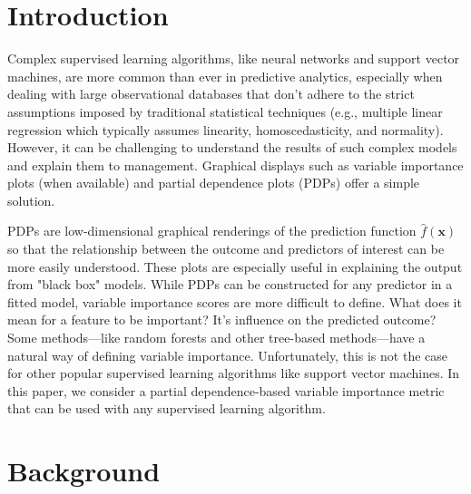 \documentclass[12pt]{article}
\begin{document}
\newpage
{} %


\section{Introduction}
\label{sec:introduction}

Complex supervised learning algorithms, like neural networks and support vector machines, are more common than ever in predictive analytics, especially when dealing with large observational databases that don't adhere to the strict assumptions imposed by traditional statistical techniques (e.g., multiple linear regression which typically assumes linearity, homoscedasticity, and normality). However, it can be challenging to understand the results of such complex models and explain them to management. Graphical displays such as variable importance plots (when available) and partial dependence plots (PDPs) offer a simple solution. 

PDPs are low-dimensional graphical renderings of the prediction function $\widehat{f}\left(\boldsymbol{x}\right)$ so that the relationship between the outcome and predictors of interest can be more easily understood. These plots are especially useful in explaining the output from "black box" models. While PDPs can be constructed for any predictor in a fitted model, variable importance scores are more difficult to define. What does it mean for a feature to be important? It's influence on the predicted outcome? Some methods---like random forests and other tree-based methods---have a natural way of defining variable importance. Unfortunately, this is not the case for other popular supervised learning algorithms like support vector machines. In this paper, we consider a partial dependence-based variable importance metric that can be used with any supervised learning algorithm.


\section{Background}
\label{sec:background}
\end{document}
